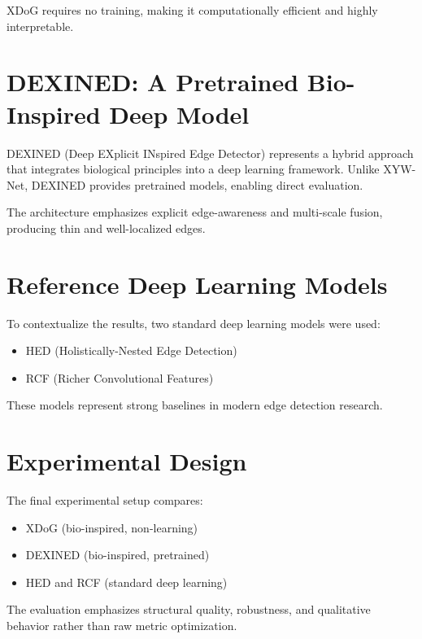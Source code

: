 \documentclass[12pt]{article}
\begin{document}
XDoG requires no training, making it computationally efficient and highly
interpretable.

\section{DEXINED: A Pretrained Bio-Inspired Deep Model}

DEXINED (Deep EXplicit INspired Edge Detector) represents a hybrid approach that
integrates biological principles into a deep learning framework. Unlike XYW-Net,
DEXINED provides pretrained models, enabling direct evaluation.

The architecture emphasizes explicit edge-awareness and multi-scale fusion,
producing thin and well-localized edges.

\section{Reference Deep Learning Models}

To contextualize the results, two standard deep learning models were used:
\begin{itemize}
\item HED (Holistically-Nested Edge Detection)
\item RCF (Richer Convolutional Features)
\end{itemize}

These models represent strong baselines in modern edge detection research.

\section{Experimental Design}

The final experimental setup compares:
\begin{itemize}
\item XDoG (bio-inspired, non-learning)
\item DEXINED (bio-inspired, pretrained)
\item HED and RCF (standard deep learning)
\end{itemize}

The evaluation emphasizes structural quality, robustness, and qualitative
behavior rather than raw metric optimization.

\end{document}
